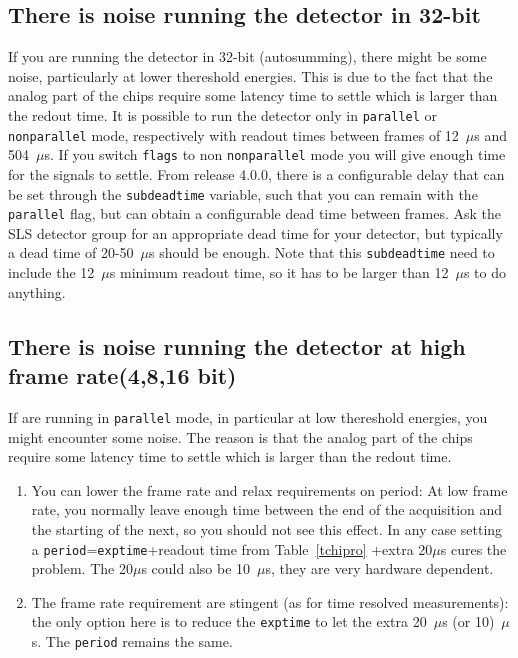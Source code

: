\documentclass{article}
\begin{document}
\subsection{There is noise running the detector in 32-bit}
If you are running the detector in 32-bit (autosumming), there might be some noise, particularly at lower thereshold energies. This is due to the fact that the analog part of the chips require some latency time to settle which is larger than the redout time. It is possible to run the detector only in {\tt{parallel}} or {\tt{nonparallel}} mode, respectively with readout times between frames of 12~$\mu$s and 504~$\mu$s. If you switch {\tt{flags}} to non {\tt{nonparallel}} mode you will give enough time for the signals to settle. From release 4.0.0, there is a configurable delay that can be set through the {\tt{subdeadtime}} variable, such that you can remain with the {\tt{parallel}} flag, but can obtain a configurable dead time between frames. Ask the SLS detector group for an appropriate dead time for your detector, but typically a dead time of 20-50~$\mu$s should be enough. Note that this {\tt{subdeadtime}} need to include the 12~$\mu$s minimum readout time, so it has to be larger than 12~$\mu$s to do anything.  
 
\subsection{There is noise running the detector at high frame rate(4,8,16 bit)}
If are running in {\tt{parallel}} mode, in particular at low thereshold energies, you might encounter some noise. The reason is that the analog part of the chips require some latency time to settle which is larger than the redout time. 
\begin{enumerate}
\item You can lower the frame rate and relax requirements on period: 
At low frame rate, you normally leave enough time between the end of the acquisition and the starting of the next, so you should not see this effect. In any case setting a {\tt{period}}={\tt{exptime}}+readout time from Table~\ref{tchipro} +extra 20$\mu$s cures the problem. The 20$\mu$s could also be 10~$\mu$s, they are very hardware dependent.
\item The frame rate requirement are stingent (as for time resolved measurements): the only option here is to reduce the {\tt{exptime}} to let the extra 20~$\mu$s (or 10)~$\mu$s. The {\tt{period}} remains the same.
\end{enumerate} 
 
\end{document}
